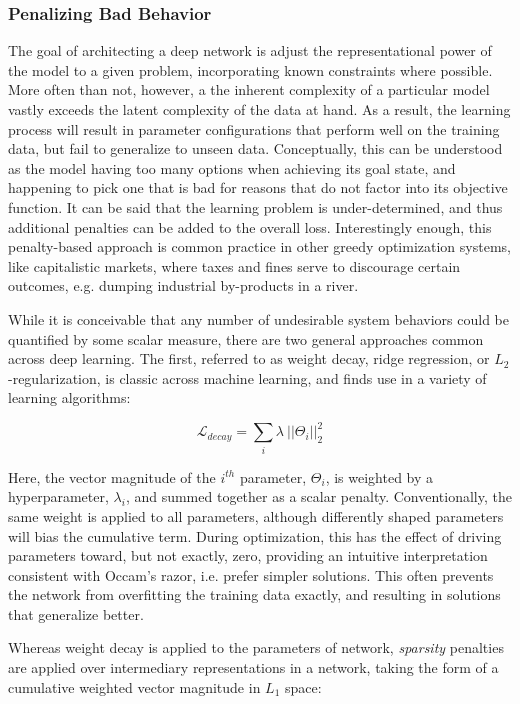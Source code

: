 \subsubsection{Penalizing Bad Behavior}

The goal of architecting a deep network is adjust the representational power of the model to a given problem, incorporating known constraints where possible.
More often than not, however, a the inherent complexity of a particular model vastly exceeds the latent complexity of the data at hand.
As a result, the learning process will result in parameter configurations that perform well on the training data, but fail to generalize to unseen data.
Conceptually, this can be understood as the model having too many options when achieving its goal state, and happening to pick one that is bad for reasons that do not factor into its objective function.
It can be said that the learning problem is under-determined, and thus additional penalties can be added to the overall loss.
Interestingly enough, this penalty-based approach is common practice in other greedy optimization systems, like capitalistic markets, where taxes and fines serve to discourage certain outcomes, e.g. dumping industrial by-products in a river.

While it is conceivable that any number of undesirable system behaviors could be quantified by some scalar measure, there are two general approaches common across deep learning.
The first, referred to as weight decay, ridge regression, or $L_2$-regularization, is classic across machine learning, and finds use in a variety of learning algorithms:

\begin{equation}
\mathcal{L}_{decay}=\sum_i\lambda~||\Theta_i||_2^2
\end{equation}

Here, the vector magnitude of the $i^{th}$ parameter, $\Theta_i$, is weighted by a hyperparameter, $\lambda_i$, and summed together as a scalar penalty.
Conventionally, the same weight is applied to all parameters, although differently shaped parameters will bias the cumulative term.
During optimization, this has the effect of driving parameters toward, but not exactly, zero, providing an intuitive interpretation consistent with Occam's razor, i.e. prefer simpler solutions.
This often prevents the network from overfitting the training data exactly, and resulting in solutions that generalize better.

Whereas weight decay is applied to the parameters of network, \emph{sparsity} penalties are applied over intermediary representations in a network, taking the form of a cumulative weighted vector magnitude in $L_1$ space:

